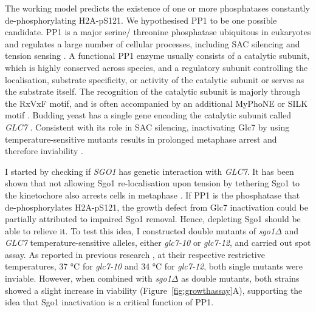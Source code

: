 The working model predicts the existence of one or more phosphatases constantly de-phosphorylating H2A-pS121. We hypothesised PP1 to be one possible candidate. PP1 is a major serine/ threonine phosphatase ubiquitous in eukaryotes and regulates a large number of cellular processes, including SAC silencing and tension sensing \citep{Shi2009Serine/threonineStructure, Cannon2010FunctionCerevisiae, Pinsky2009ProteinYeast, Pinsky2006Glc7/proteinGlc7, London2012, Meadows2011SpindleMotors, Nijenhuis2014NegativeSignal, Rosenberg2011KNL1/Spc105Checkpoint, Liu2010RegulatedKinase, Posch2010Sds22Mitosis, Jin2013TheAttachment}. A functional PP1 enzyme usually consists of a catalytic subunit, which is highly conserved across species, and a regulatory subunit controlling the localisation, substrate specificity, or activity of the catalytic subunit or serves as the substrate itself. The recognition of the catalytic subunit is majorly through the RxVxF motif, and is often accompanied by an additional MyPhoNE or SILK motif \citep{Hendrickx2009DockingPhosphatase-1}. Budding yeast has a single gene encoding the catalytic subunit called \textit{GLC7} \citep{Cannon2010FunctionCerevisiae}. Consistent with its role in SAC silencing, inactivating Glc7 by using temperature-sensitive mutants results in prolonged metaphase arrest and therefore inviability \citep{Andrews2000TypeCerevisiae, MacKelvie1995ThePhosphatase}. 

I started by checking if \textit{SGO1} has genetic interaction with \textit{GLC7}. It has been shown that not allowing Sgo1 re-localisation upon tension by tethering Sgo1 to the kinetochore also arrests cells in metaphase \citep{Su2021SumoylationAnaphase}. If PP1 is the phosphatase that de-phosphorylates H2A-pS121, the growth defect from Glc7 inactivation could be partially attributed to impaired Sgo1 removal. Hence, depleting Sgo1 should be able to relieve it. To test this idea, I constructed double mutants of \textit{sgo1$\Delta$} and \textit{GLC7} temperature-sensitive alleles, either \textit{glc7-10} or \textit{glc7-12}, and carried out spot assay. As reported in previous research \citep{MacKelvie1995ThePhosphatase, Andrews2000TypeCerevisiae}, at their respective restrictive temperatures, 37 \si{\celsius} for \textit{glc7-10} and 34 \si{\celsius} for \textit{glc7-12}, both single mutants were inviable. However, when combined with \textit{sgo1$\Delta$} as double mutants, both strains showed a slight increase in viability (Figure~\ref{fig:growthassay}A), supporting the idea that Sgo1 inactivation is a critical function of PP1. 

